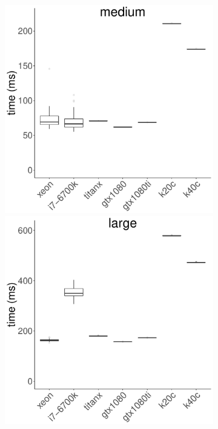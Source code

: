 \documentclass[../document.tex]{subfiles}
\begin{document}
\begin{figure}
\begin{subfigure}{0.9\textwidth}
		\includegraphics[width=\plotwidth]{figures/time-results/generate_kmeans_no_knl_medium_boxplot-1}
		\includegraphics[width=\plotwidth]{figures/time-results/generate_kmeans_no_knl_large_boxplot-1}
	\end{subfigure}


\end{figure}
\end{document}
